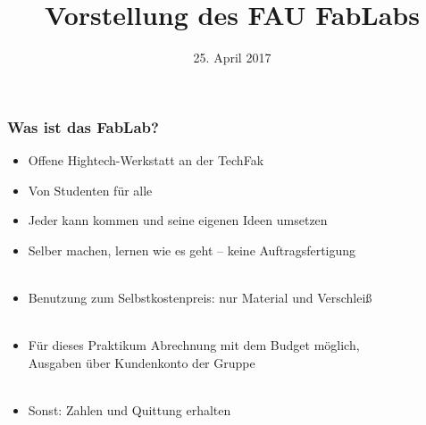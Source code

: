 \documentclass[t]{beamer}
\begin{document}


\date{25. April 2017}
\title[Vorstellung]{Vorstellung des FAU FabLabs}
\author{} %
\frame[plain,c]{\titlepage} %




\begin{frame}
    \frametitle{Was ist das FabLab?}
    \begin{itemize}
        \item Offene Hightech-Werkstatt an der TechFak
        \item Von Studenten für alle
        \item Jeder kann kommen und seine eigenen Ideen umsetzen
        \item Selber machen, lernen wie es geht -- keine Auftragsfertigung\\~
        \item Benutzung zum Selbstkostenpreis: nur Material und Verschleiß\\~
        \item Für dieses Praktikum Abrechnung mit dem Budget möglich,\\
        Ausgaben über Kundenkonto der Gruppe\\~
        \item Sonst: Zahlen und Quittung erhalten
    \end{itemize}

\end{frame}

%
%
\end{document}

